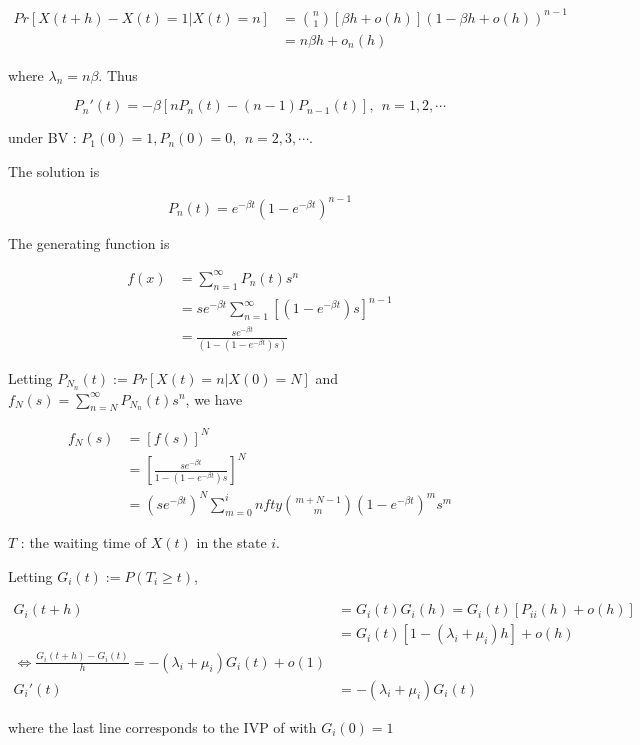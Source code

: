 \documentclass[12pt]{article}
\theoremstyle{nonumberbreak}
\begin{document}
$$
\begin{aligned}
Pr[X(t+h) - X(t) = 1 | X(t) = n] &= \binom{n}{1} \left[ \beta h + o(h) \right] \left( 1 - \beta h + o(h) \right)^{n-1} \\[8pt]
&= n\beta h + o_n(h)
\end{aligned}
$$

where $\lambda_n = n \beta$. Thus

$$
P_n'(t) = -\beta [nP_n(t) - (n-1) P_{n-1}(t) ], \ \ n=1,2,\cdots
$$

under BV : $P_1(0)=1, P_n(0)=0, \ \ n=2,3,\cdots$. 

The solution is 

$$
P_n(t) = e^{-\beta t} (1 - e^{-\beta t})^{n-1}
$$

The generating function is 

$$
\begin{aligned}
f(x) &= \sum_{n=1}^\infty P_n(t) s^n \\[8pt]
&= s e^{-\beta t} \sum_{n=1}^\infty \left[ (1-e^{-\beta t}) s \right]^{n-1} \\[8pt]
&= \frac{se^{-\beta t}}{ (1 - (1-e^{-\beta t})s) }
\end{aligned}
$$

Letting $P_{N_n}(t) := Pr[X(t) = n | X(0) = N]$ and $f_N(s) = \sum_{n=N}^\infty P_{N_n}(t)s^n$, we have


$$
\begin{aligned}
f_N(s) &= [f(s)]^N \\[8pt]
&= \left[ \frac{se^{-\beta t}}{1 - (1-e^{-\beta t})s} \right]^N \\[8pt]
&= (s e^{-\beta t})^N \sum_{m=0}^infty \binom{m+N-1}{m} (1-e^{-\beta t})^m s^m
\end{aligned}
$$



$T$ : the waiting time of $X(t)$ in the state $i$. 


Letting $G_i(t) := P(T_i \ge t)$, 

$$
\begin{aligned}
G_i (t+h) &= G_i(t) G_i(h) = G_i(t) \left[ P_{ii}(h) + o(h) \right] \\[8pt]
&= G_i(t) [ 1- (\lambda_i + \mu_i)h ] + o(h) \\[10pt]
\Leftrightarrow \frac{ G_i(t+h) - G_i(t)  }{ h } = -(\lambda_i + \mu_i) G_i(t) + o(1) \\[8pt]
G_i'(t) &= -(\lambda_i + \mu_i) G_i(t)
\end{aligned}
$$

where the last line corresponds to the IVP of with $G_i(0) = 1$
\end{document}
